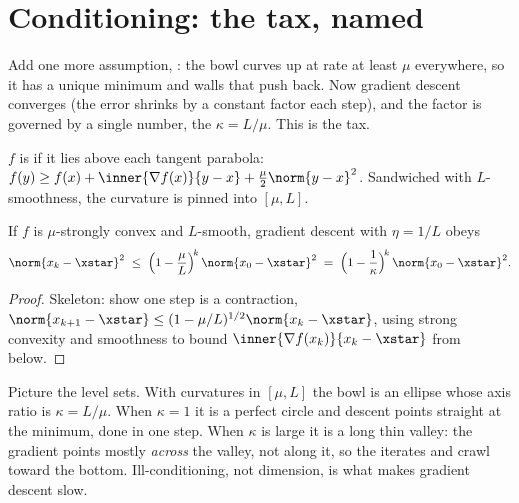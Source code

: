 \section{Conditioning: the tax, named}\label{sec:cond}
\quad{}

\begin{strand}
Add one more assumption, : the bowl curves up at rate at least $\mu$
everywhere, so it has a unique minimum and walls that push back. Now gradient descent converges
 (the error shrinks by a constant factor each step), and the factor is governed
by a single number, the  $\kappa=L/\mu$. This is the tax.
\end{strand}


\begin{definition}\label{def:strong}
$f$ is  if it lies above each tangent parabola:
$f(y)\ge f(x)+\inner{\nabla f(x)}{y-x}+\tfrac{\mu}{2}\norm{y-x}^2$. Sandwiched with $L$-smoothness,
the curvature is pinned into $[\mu,L]$.
\end{definition}

\begin{theorem}\label{thm:linear}
If $f$ is $\mu$-strongly convex and $L$-smooth, gradient descent with $\eta=1/L$ obeys
\[
  \norm{x_k-\xstar}^2\;\le\;\Big(1-\frac{\mu}{L}\Big)^{\!k}\,\norm{x_0-\xstar}^2
  \;=\;\Big(1-\frac1\kappa\Big)^{\!k}\,\norm{x_0-\xstar}^2 .
\]
\end{theorem}
\begin{proof}
Skeleton: show one step is a contraction, $\norm{x_{k+1}-\xstar}\le(1-\mu/L)^{1/2}\norm{x_k-\xstar}$,
using strong convexity and smoothness to bound $\inner{\nabla f(x_k)}{x_k-\xstar}$ from below.
\end{proof}

\begin{strand}
Picture the level sets. With curvatures in $[\mu,L]$ the bowl is an ellipse whose axis ratio is
$\kappa=L/\mu$. When $\kappa=1$ it is a perfect circle and descent points straight at the minimum,
done in one step. When $\kappa$ is large it is a long thin valley: the gradient points mostly
\emph{across} the valley, not along it, so the iterates  and crawl toward the bottom.
Ill-conditioning, not dimension, is what makes gradient descent slow.
\end{strand}


